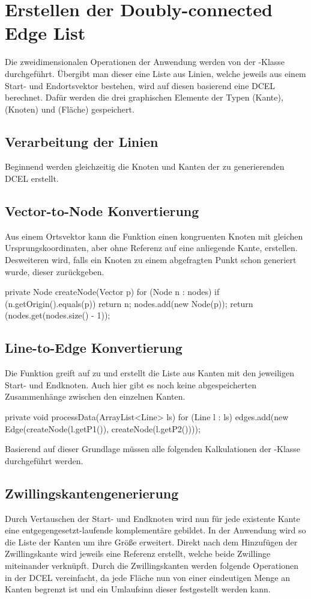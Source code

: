 \section{Erstellen der Doubly-connected Edge List}
Die zweidimensionalen Operationen der Anwendung werden von der -Klasse durchgeführt. 
Übergibt man dieser eine Liste aus Linien, welche jeweils aus einem Start- und Endortsvektor bestehen, wird auf diesen basierend eine DCEL berechnet.
Dafür werden die drei graphischen Elemente der Typen (Kante), (Knoten) und (Fläche) gespeichert.

\subsection{Verarbeitung der Linien}
Beginnend werden gleichzeitig die Knoten und Kanten der zu generierenden DCEL erstellt.
\subsection{Vector-to-Node Konvertierung}
Aus einem Ortsvektor kann die Funktion  einen kongruenten Knoten mit gleichen Ursprungskoordinaten, aber ohne Referenz auf eine anliegende Kante, erstellen. 
Desweiteren wird, falls ein Knoten zu einem abgefragten Punkt schon generiert wurde, dieser zurückgeben.
\begin{code}
	private Node createNode(Vector p) {
		for (Node n : nodes) {
			if (n.getOrigin().equals(p)) {
				return n;
			}
		}
		nodes.add(new Node(p));
		return (nodes.get(nodes.size() - 1));
	}
\end{code}
\subsection{Line-to-Edge Konvertierung}
\label{subsec:ltoe} 
Die  Funktion greift auf  zu und erstellt die Liste aus Kanten mit den jeweiligen Start- und Endknoten.
Auch hier gibt es noch keine abgespeicherten Zusammenhänge zwischen den einzelnen Kanten.
\begin{code}
private void processData(ArrayList<Line> ls) {
	for (Line l : ls) {
		edges.add(new Edge(createNode(l.getP1()), createNode(l.getP2())));
	}
}
\end{code}
Basierend auf dieser Grundlage müssen alle folgenden Kalkulationen der -Klasse durchgeführt werden.
\subsection{Zwillingskantengenerierung}
Durch Vertauschen der Start- und Endknoten wird nun für jede existente Kante eine entgegengesetzt-laufende komplementäre  gebildet.
In der Anwendung wird so die Liste der Kanten um ihre Größe erweitert.
Direkt nach dem Hinzufügen der Zwillingskante wird jeweils eine Referenz erstellt, welche beide Zwillinge miteinander verknüpft. 
Durch die Zwillingskanten werden folgende Operationen in der DCEL vereinfacht, da jede Fläche nun von einer eindeutigen Menge an Kanten begrenzt ist und ein Umlaufsinn dieser festgestellt werden kann.

